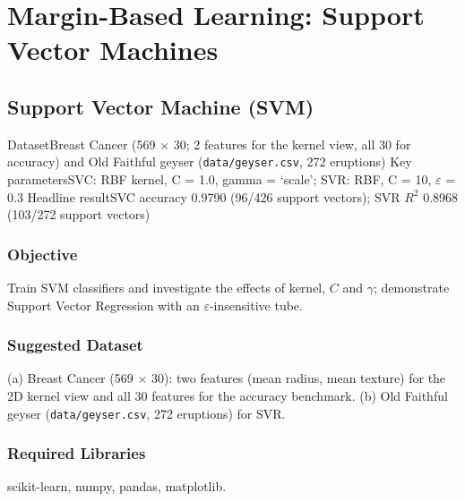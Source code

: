 
\part{Margin-Based Learning: Support Vector Machines}

\chapter{Support Vector Machine (SVM)}\label{exp:17}


\quickfacts
  {Dataset}{Breast Cancer (569 $\times$ 30; 2 features for the kernel view, all 30 for accuracy) and Old Faithful geyser (\texttt{data/geyser.csv}, 272 eruptions)}
  {Key parameters}{SVC: RBF kernel, C = 1.0, gamma = `scale'; SVR: RBF, C = 10, $\varepsilon$ = 0.3}
  {Headline result}{SVC accuracy 0.9790 (96/426 support vectors); SVR $R^2$ 0.8968 (103/272 support vectors)}

\section{Objective}
Train SVM classifiers and investigate the effects of kernel, $C$ and $\gamma$; demonstrate
Support Vector Regression with an $\varepsilon$-insensitive tube.

\section{Suggested Dataset}
(a) Breast Cancer (569 $\times$ 30): two features (mean radius, mean texture) for the 2D
kernel view and all 30 features for the accuracy benchmark. (b) Old Faithful geyser
(\texttt{data/geyser.csv}, 272 eruptions) for SVR.

\section{Required Libraries}
scikit-learn, numpy, pandas, matplotlib.

